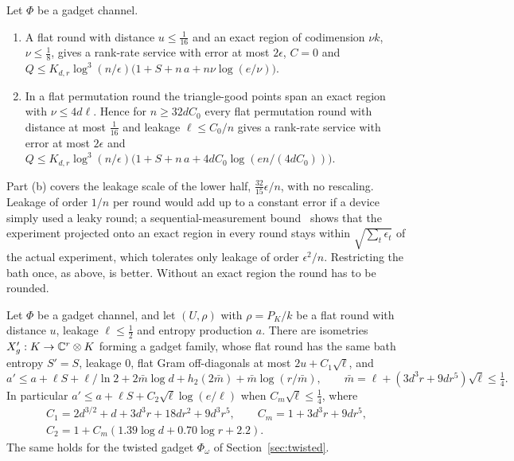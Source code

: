 \begin{theorem}\label{thm:exact-region}
Let $\Phi$ be a gadget channel.
\begin{enumerate}[label=(\alph*),itemsep=1pt]
\item A flat round with distance $u\le\frac1{16}$ and an exact region of codimension $\nu k$, $\nu\le\frac18$, gives a rank-rate service with
error at most $2\epsilon$, $C=0$ and $Q\le K_{d,r}\log^3(n/\epsilon)\bigl(1+S+n\,a+n\nu\log(e/\nu)\bigr)$.
\item In a flat permutation round the triangle-good points span an exact region with $\nu\le4d\ell$. Hence for $n\ge32dC_0$ every flat
permutation round with distance at most $\frac1{16}$ and leakage $\ell\le C_0/n$ gives a rank-rate service with error at most $2\epsilon$ and
$Q\le K_{d,r}\log^3(n/\epsilon)\bigl(1+S+n\,a+4dC_0\log(en/(4dC_0))\bigr)$.
\end{enumerate}
\end{theorem}

Part (b) covers the leakage scale of the lower half, $\frac{32}{15}\epsilon/n$, with no rescaling. Leakage of order $1/n$ per round would add up
to a constant error if a device simply used a leaky round; a sequential-measurement bound~\cite[Theorem~1]{Gao2015} shows that the experiment
projected onto an exact region in every round stays within $\sqrt{\sum_t\epsilon_t}$ of the actual experiment, which tolerates only leakage of order
$\epsilon^2/n$. Restricting the bath once, as above, is better. Without an exact region the round has to be rounded.

\begin{theorem}\label{thm:F}
Let $\Phi$ be a gadget channel, and let $(U,\rho)$ with $\rho=P_K/k$ be a flat round with distance $u$, leakage $\ell\le\frac12$ and entropy
production $a$. There are isometries $X'_g:K\to\mathbb C^r\otimes K$ forming a gadget family, whose flat round has the same bath entropy $S'=S$,
leakage $0$, flat Gram off-diagonals at most $2u+C_1\sqrt\ell$, and
\[
a'\le a+\ell S+\ell/\ln2+2\bar m\log d+h_2(2\bar m)+\bar m\log(r/\bar m),\qquad \bar m=\ell+(3d^3r+9dr^5)\sqrt\ell\le\tfrac14 .
\]
In particular $a'\le a+\ell S+C_2\sqrt\ell\log(e/\ell)$ when $C_m\sqrt\ell\le\frac14$, where
\begin{gather*}
C_1=2d^{3/2}+d+3d^3r+18dr^2+9d^3r^5,\qquad C_m=1+3d^3r+9dr^5,\\
C_2=1+C_m(1.39\log d+0.70\log r+2.2).
\end{gather*}
The same holds for the twisted gadget $\Phi_\omega$ of Section~\ref{sec:twisted}.
\end{theorem}


